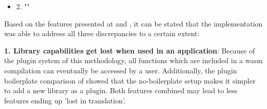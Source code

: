 







\begin{itemize}[ ]
  \item 2. "\myNewSubRQTwo"
\end{itemize}

Based on the features presented at  and , it can be stated that
the implementation was able to address all three discrepancies to a certain extent:

\textbf{1. Library capabilities get lost when used in an application}:
Because of the plugin system of this methodology, all functions which are included in a wasm compilation can eventually be accessed by a user. 
Additionally, the plugin boilerplate comparison of  showed that the no-boilerplate setup makes it simpler to add a new library as a plugin. 
Both features combined may lead to less features ending up 'lost in translation'.


